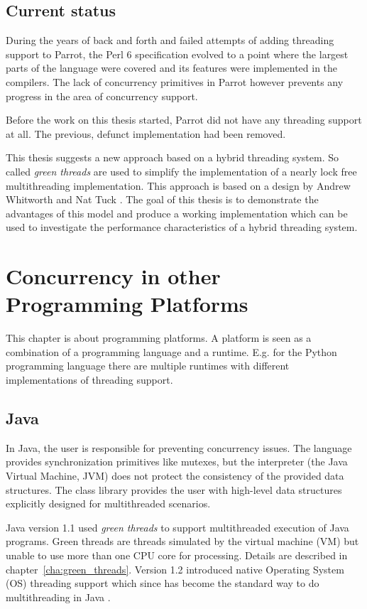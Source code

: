 \documentclass[bachelor,english]{hgbthesis}
\begin{document}
\section{Current status}

During the years of back and forth and failed attempts of adding threading support to Parrot, the Perl 6 specification evolved to a point where the largest parts of the language were covered and its features were implemented in the compilers. The lack of concurrency primitives in Parrot however prevents any progress in the area of concurrency support.

Before the work on this thesis started, Parrot did not have any threading support at all. The previous, defunct implementation had been removed.

This thesis suggests a new approach based on a hybrid threading system. So called \textit{green threads} are used to simplify the implementation of a nearly lock free multithreading implementation. This approach is based on a design by Andrew Whitworth and Nat Tuck \cite{WKnightThreading}. The goal of this thesis is to demonstrate the advantages of this model and produce a working implementation which can be used to investigate the performance characteristics of a hybrid threading system.

\chapter{Concurrency in other Programming Platforms}

This chapter is about programming platforms. A platform is seen as a combination of a programming language and a runtime. E.g. for the Python programming language there are multiple runtimes with different implementations of threading support.

\section{Java}

In Java, the user is responsible for preventing concurrency issues. The language provides synchronization primitives like mutexes, but the interpreter (the Java Virtual Machine, JVM) does not protect the consistency of the provided data structures. The class library provides the user with high-level data structures explicitly designed for multithreaded scenarios.

Java version 1.1 used \textit{green threads} to support multithreaded execution of Java programs. Green threads are threads simulated by the virtual machine (VM) but unable to use more than one CPU core for processing. Details are described in chapter~\ref{cha:green_threads}. Version 1.2 introduced native Operating System (OS) threading support which since has become the standard way to do multithreading in Java \cite{JavaThreadManual}.
\end{document}
